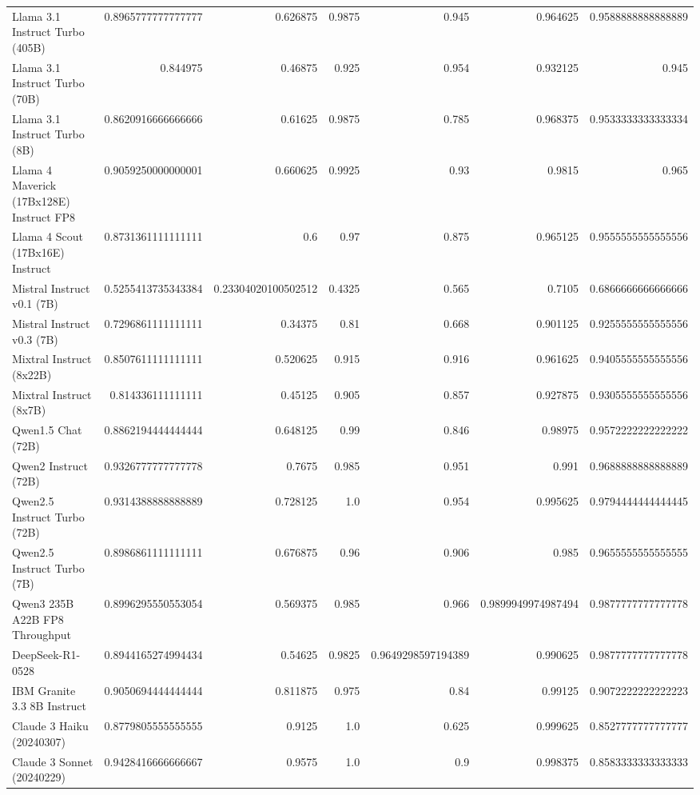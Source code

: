 \begin{table}[htp]
{\begin{tabular}{lrrrrrr}
Llama 3.1 Instruct Turbo (405B) & 0.8965777777777777 & 0.626875 & 0.9875 & 0.945 & 0.964625 & 0.9588888888888889 \\
Llama 3.1 Instruct Turbo (70B) & 0.844975 & 0.46875 & 0.925 & 0.954 & 0.932125 & 0.945 \\
Llama 3.1 Instruct Turbo (8B) & 0.8620916666666666 & 0.61625 & 0.9875 & 0.785 & 0.968375 & 0.9533333333333334 \\
Llama 4 Maverick (17Bx128E) Instruct FP8 & 0.9059250000000001 & 0.660625 & 0.9925 & 0.93 & 0.9815 & 0.965 \\
Llama 4 Scout (17Bx16E) Instruct & 0.8731361111111111 & 0.6 & 0.97 & 0.875 & 0.965125 & 0.9555555555555556 \\
Mistral Instruct v0.1 (7B) & 0.5255413735343384 & 0.23304020100502512 & 0.4325 & 0.565 & 0.7105 & 0.6866666666666666 \\
Mistral Instruct v0.3 (7B) & 0.7296861111111111 & 0.34375 & 0.81 & 0.668 & 0.901125 & 0.9255555555555556 \\
Mixtral Instruct (8x22B) & 0.8507611111111111 & 0.520625 & 0.915 & 0.916 & 0.961625 & 0.9405555555555556 \\
Mixtral Instruct (8x7B) & 0.814336111111111 & 0.45125 & 0.905 & 0.857 & 0.927875 & 0.9305555555555556 \\
Qwen1.5 Chat (72B) & 0.8862194444444444 & 0.648125 & 0.99 & 0.846 & 0.98975 & 0.9572222222222222 \\
Qwen2 Instruct (72B) & 0.9326777777777778 & 0.7675 & 0.985 & 0.951 & 0.991 & 0.9688888888888889 \\
Qwen2.5 Instruct Turbo (72B) & 0.9314388888888889 & 0.728125 & 1.0 & 0.954 & 0.995625 & 0.9794444444444445 \\
Qwen2.5 Instruct Turbo (7B) & 0.8986861111111111 & 0.676875 & 0.96 & 0.906 & 0.985 & 0.9655555555555555 \\
Qwen3 235B A22B FP8 Throughput & 0.8996295550553054 & 0.569375 & 0.985 & 0.966 & 0.9899949974987494 & 0.9877777777777778 \\
DeepSeek-R1-0528 & 0.8944165274994434 & 0.54625 & 0.9825 & 0.9649298597194389 & 0.990625 & 0.9877777777777778 \\
IBM Granite 3.3 8B Instruct & 0.9050694444444444 & 0.811875 & 0.975 & 0.84 & 0.99125 & 0.9072222222222223 \\
Claude 3 Haiku (20240307) & 0.8779805555555555 & 0.9125 & 1.0 & 0.625 & 0.999625 & 0.8527777777777777 \\
Claude 3 Sonnet (20240229) & 0.9428416666666667 & 0.9575 & 1.0 & 0.9 & 0.998375 & 0.8583333333333333 \\

\end{tabular}}
\end{table}
